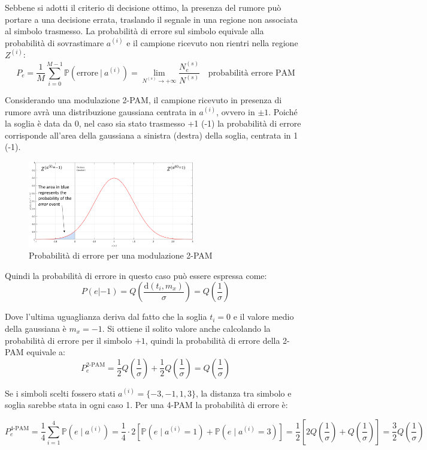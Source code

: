 Sebbene si adotti il criterio di decisione ottimo, la presenza del rumore può portare a una decisione errata, traslando il segnale in una regione non associata al simbolo trasmesso.
La probabilità di errore sul simbolo equivale alla probabilità di sovrastimare $a^{(i)}$ e il campione ricevuto non rientri nella regione $Z^{(i)}$:
\[
    P_e = \frac{1}{M} \sum_{i=0}^{M-1} \mathbb{P}(\text{errore} \ | \ a^{(i)}) = \lim_{N^{(s)} \to +\infty} \frac{N_e^{(s)}}{N^{(s)}} \quad \text{probabilità errore PAM}
\]

Considerando una modulazione 2-PAM, il campione ricevuto in presenza di rumore avrà una distribuzione gaussiana centrata in $a^{(i)}$, ovvero in $\pm 1$. Poiché la soglia è data da 0, nel caso sia stato trasmesso +1 (-1) la probabilità di errore corrisponde all'area della gaussiana a sinistra (destra) della soglia, centrata in 1 (-1).

\begin{figure}[ht]
    \centering
    \includegraphics[width=0.65\textwidth]{imgs/2pamerror.jpg}
    \caption*{Probabilità di errore per una modulazione 2-PAM}
\end{figure}


Quindi la probabilità di errore in questo caso può essere espressa come:
\[
    P(e | -1) = Q\left(\frac{\text{d}(t_i, m_x)}{\sigma}\right) = Q\left(\frac{1}{\sigma}\right)
\]

Dove l'ultima uguaglianza deriva dal fatto che la soglia $t_i=0$ e il valore medio della gaussiana è $m_x = -1$.
Si ottiene il solito valore anche calcolando la probabilità di errore per il simbolo $+1$, quindi la probabilità di errore della 2-PAM equivale a:
\[
    P^{\text{2-PAM}}_e = \frac{1}{2} Q\left(\frac{1}{\sigma}\right) + \frac{1}{2} Q\left(\frac{1}{\sigma}\right) = Q\left(\frac{1}{\sigma}\right)
\]

Se i simboli scelti fossero stati $a^{(i)} = \{-3, -1, 1, 3\}$, la distanza tra simbolo e soglia sarebbe stata in ogni caso 1.
Per una 4-PAM la probabilità di errore è:

\[
    P^{\text{4-PAM}}_e = \frac{1}{4} \sum_{i=1}^{4} \mathbb{P}(e \mid a^{(i)}) = \frac{1}{4} \cdot 2 \left[ \mathbb{P}(e \mid a^{(i)} = 1) + \mathbb{P}(e \mid a^{(i)} = 3) \right] = \frac{1}{2} \left[ 2 Q\left( \frac{1}{\sigma} \right) + Q\left( \frac{1}{\sigma} \right) \right] = \frac{3}{2} Q\left( \frac{1}{\sigma} \right)
\]

